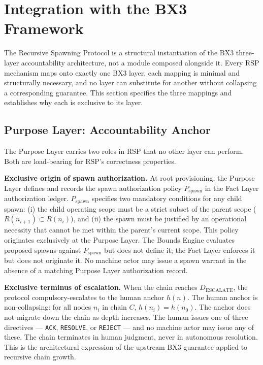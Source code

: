 \section{Integration with the BX3 Framework}
\label{sec:rs-integration}

The Recursive Spawning Protocol is a structural instantiation of the BX3 three-layer accountability architecture, not a module composed alongside it. Every RSP mechanism maps onto exactly one BX3 layer, each mapping is minimal and structurally necessary, and no layer can substitute for another without collapsing a corresponding guarantee. This section specifies the three mappings and establishes why each is exclusive to its layer.

\subsection{Purpose Layer: Accountability Anchor}
\label{sec:rs-purpose-layer}

The Purpose Layer carries two roles in RSP that no other layer can perform. Both are load-bearing for RSP's correctness properties.

\medskip
\noindent\textbf{Exclusive origin of spawn authorization.} At root provisioning, the Purpose Layer defines and records the spawn authorization policy $P_{\mathrm{spawn}}$ in the Fact Layer authorization ledger. $P_{\mathrm{spawn}}$ specifies two mandatory conditions for any child spawn: (i) the child operating scope must be a strict subset of the parent scope ($R(n_{i+1}) \subset R(n_i)$), and (ii) the spawn must be justified by an operational necessity that cannot be met within the parent's current scope. This policy originates exclusively at the Purpose Layer. The Bounds Engine evaluates proposed spawns against $P_{\mathrm{spawn}}$ but does not define it; the Fact Layer enforces it but does not originate it. No machine actor may issue a spawn warrant in the absence of a matching Purpose Layer authorization record.

\medskip
\noindent\textbf{Exclusive terminus of escalation.} When the chain reaches $D_{\mathrm{ESCALATE}}$, the protocol compulsory-escalates to the human anchor $h(n)$. The human anchor is non-collapsing: for all nodes $n_i$ in chain $C$, $h(n_i) = h(n_0)$. The anchor does not migrate down the chain as depth increases. The human issues one of three directives --- \texttt{ACK}, \texttt{RESOLVE}, or \texttt{REJECT} --- and no machine actor may issue any of these. The chain terminates in human judgment, never in autonomous resolution. This is the architectural expression of the upstream BX3 guarantee applied to recursive chain growth.

